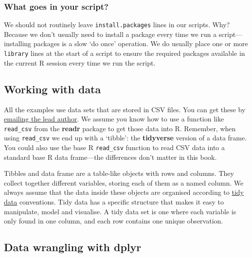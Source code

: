 \documentclass[
]{book}
\newenvironment{greybox}{
  \definecolor{shadecolor}{rgb}{0.95,0.95,0.95}  %
  \color{black}
  \begin{shaded}}
 {\end{shaded}}
\newenvironment{infobox}[1]
  {
  \begin{itemize}
  \renewcommand{\labelitemi}{
    \raisebox{-.7\height}[0pt][0pt]{
      {\setkeys{Gin}{width=3em,keepaspectratio}
        \texttt{[image: images/\#1]}}
    }
  }
  \setlength{\fboxsep}{1em}
  \begin{greybox}
  \item
  }
  {
  \end{greybox}
  \end{itemize}
  }
\begin{document}
\begin{infobox}{warning}

\hypertarget{what-goes-in-your-script}{%
\subsubsection*{What goes in your script?}\label{what-goes-in-your-script}}

We should not routinely leave \texttt{install.packages} lines in our scripts. Why? Because we don't usually need to install a package every time we run a script---installing packages is a slow `do once' operation. We do usually place one or more \texttt{library} lines at the start of a script to ensure the required packages available in the current R session every time we run the script.

\end{infobox}

\hypertarget{working-with-data}{%
\subsection*{Working with data}\label{working-with-data}}

All the examples use data sets that are stored in CSV files. You can get these by \href{mailto:d.childs@sheffield.ac.uk}{emailing the lead author}. We assume you know how to use a function like \texttt{read\_csv} from the \textbf{readr} package to get those data into R. Remember, when using \texttt{read\_csv} we end up with a `tibble': the \textbf{tidyverse} version of a data frame. You could also use the base R \texttt{read\_csv} function to read CSV data into a standard base R data frame---the differences don't matter in this book.

Tibbles and data frame are a table-like objects with rows and columns. They collect together different variables, storing each of them as a named column. We always assume that the data inside these objects are organised according to \href{http://vita.had.co.nz/papers/tidy-data.pdf}{tidy data} conventions. Tidy data has a specific structure that makes it easy to manipulate, model and visualise. A tidy data set is one where each variable is only found in one column, and each row contains one unique observation.

\hypertarget{data-wrangling-with-dplyr}{%
\subsection*{\texorpdfstring{Data wrangling with \textbf{dplyr}}{Data wrangling with dplyr}}\label{data-wrangling-with-dplyr}}
\end{document}
